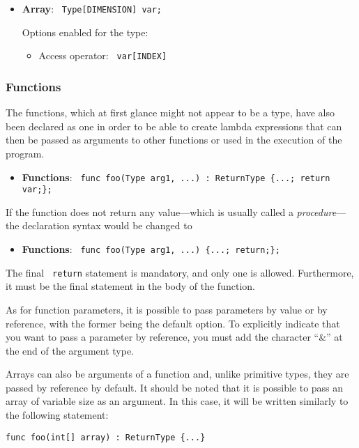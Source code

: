 \documentclass[10pt,a4paper]{article}
\begin{document}
\begin{itemize}
    \item \textbf{Array}: \texttt{\color{blue} Type[DIMENSION] var;}
    
    Options enabled for the type:
    \begin{itemize}
        \item Access operator: \texttt{\color{blue} var[INDEX]}
    \end{itemize}
\end{itemize}

\subsubsection{Functions}
The functions, which at first glance might not appear to be a type, have also been declared as one in order to be able to create lambda expressions that can then be passed as arguments to other functions or used in the execution of the program.
\begin{itemize}
    \item \textbf{Functions}: \texttt{\color{blue} func foo(Type arg1, ...) : ReturnType \{...; return var;\};}
\end{itemize}
If the function does not return any value—which is usually called a \textit{procedure}—the declaration syntax would be changed to
\begin{itemize}
    \item \textbf{Functions}: \texttt{\color{blue} func foo(Type arg1, ...) \{...; return;\};}
\end{itemize}

The final \texttt{\color{blue} return} statement is mandatory, and only one is allowed. Furthermore, it must be the final statement in the body of the function.

As for function parameters, it is possible to pass parameters by value or by reference, with the former being the default option. To explicitly indicate that you want to pass a parameter by reference, you must add the character ``\&'' at the end of the argument type.

Arrays can also be arguments of a function and, unlike primitive types, they are passed by reference by default. It should be noted that it is possible to pass an array of variable size as an argument. In this case, it will be written similarly to the following statement:

\begin{center}
    \texttt{\color{blue}func foo(int[] array) : ReturnType \{...\}}
\end{center}
\end{document}

